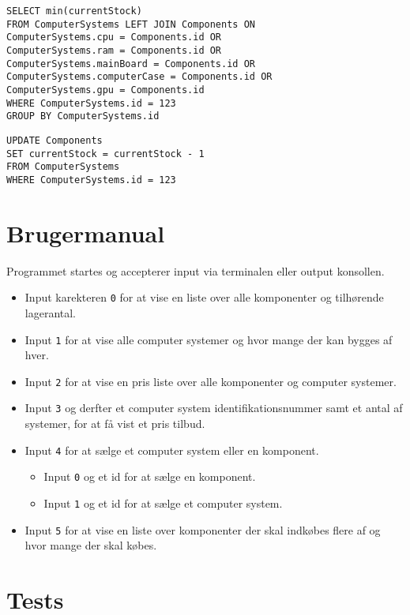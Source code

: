\documentclass[a4paper]{article}
\begin{document}
\begin{verbatim}
SELECT min(currentStock)
FROM ComputerSystems LEFT JOIN Components ON
ComputerSystems.cpu = Components.id OR
ComputerSystems.ram = Components.id OR
ComputerSystems.mainBoard = Components.id OR
ComputerSystems.computerCase = Components.id OR
ComputerSystems.gpu = Components.id
WHERE ComputerSystems.id = 123
GROUP BY ComputerSystems.id
\end{verbatim}
 
 
\begin{verbatim}
UPDATE Components
SET currentStock = currentStock - 1
FROM ComputerSystems
WHERE ComputerSystems.id = 123
\end{verbatim}

\section{Brugermanual}
Programmet startes og accepterer input via terminalen eller output konsollen.
\begin{itemize}
    \item Input karekteren \texttt{0} for at vise en liste over alle komponenter og tilhørende lagerantal.
    \item Input \texttt{1} for at vise alle computer systemer og hvor mange der kan bygges af hver.
    \item Input \texttt{2} for at vise en pris liste over alle komponenter og computer systemer.
    \item Input \texttt{3} og derfter et computer system identifikationsnummer samt et antal af systemer, for at få vist et pris tilbud.
    \item Input \texttt{4} for at sælge et computer system eller en komponent.

        \begin{itemize}
            \item Input \texttt{0} og et id for at sælge en komponent.
            \item Input \texttt{1} og et id for at sælge et computer system.
        \end{itemize}

    \item Input \texttt{5} for at vise en liste over komponenter der skal indkøbes flere af og hvor mange der skal købes.
\end{itemize}

\section{Tests}
\end{document}

